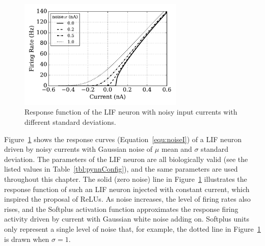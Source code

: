 	
	\begin{figure}[bt]
		\centering
		\includegraphics[width=0.7\textwidth]{pics_iconip/1.pdf}
		\caption{Response function of the LIF neuron with noisy input currents with different standard deviations.}
		\label{Fig:physics}
	\end{figure}
	
	Figure~\ref{Fig:physics} shows the response curves (Equation~\ref{equ:noiseI}) of a LIF neuron driven by noisy currents with Gaussian noise of $\mu$ mean and $\sigma$ standard deviation.
	The parameters of the LIF neuron are all biologically valid (see the listed values in Table~\ref{tbl:pynnConfig}), and the same parameters are used throughout this chapter.
	The solid (zero noise) line in Figure~\ref{Fig:physics} illustrates the response function of such an LIF neuron injected with constant current, which inspired the proposal of ReLUs.
	As noise increases, the level of firing rates also rises, and the Softplus activation function approximates the response firing activity driven by current with Gaussian white noise adding on.
	Softplus units only represent a single level of noise that, for example, the dotted line in Figure~\ref{Fig:physics} is drawn when $\sigma=1$.
	
